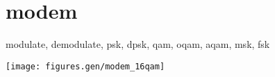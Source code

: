 % 
%

\section{modem}
\label{module:modem}
modulate, demodulate, psk, dpsk, qam, oqam, aqam, msk, fsk

\texttt{[image: figures.gen/modem\_16qam]}
